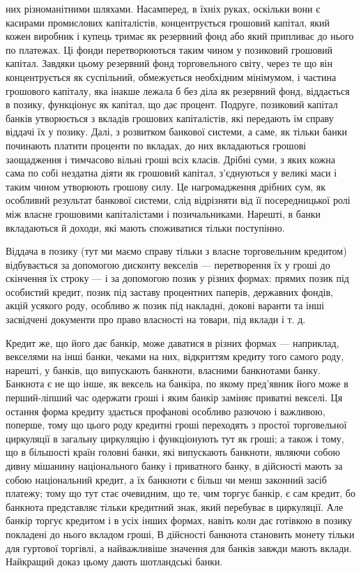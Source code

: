 \parcont{}  %
них різноманітними шляхами. Насамперед, в їхніх руках, оскільки
вони є касирами промислових капіталістів, концентрується грошовий
капітал, який кожен виробник і купець тримає як резервний
фонд або який припливає до нього по платежах. Ці
фонди перетворюються таким чином у позиковий грошовий
капітал. Завдяки цьому резервний фонд торговельного світу,
через те що він концентрується як суспільний, обмежується
необхідним мінімумом, і частина грошового капіталу, яка інакше
лежала б без діла як резервний фонд, віддається в позику,
функціонує як капітал, що дає процент. Подруге, позиковий
капітал банків утворюється з вкладів грошових капіталістів, які
передають їм справу віддачі їх у позику. Далі, з розвитком банкової
системи, а саме, як тільки банки починають платити проценти
по вкладах, до них вкладаються грошові заощадження
і тимчасово вільні гроші всіх класів. Дрібні суми, з яких кожна
сама по собі нездатна діяти як грошовий капітал, з’єднуються
у великі маси і таким чином утворюють грошову силу. Це нагромадження
дрібних сум, як особливий результат банкової системи,
слід відрізняти від її посередницької ролі між власне грошовими
капіталістами і позичальниками. Нарешті, в банки вкладаються
й доходи, які мають споживатися тільки поступінно.

Віддача в позику (тут ми маємо справу тільки з власне торговельним
кредитом) відбувається за допомогою дисконту векселів
— перетворення їх у гроші до скінчення їх строку — і за
допомогою позик у різних формах: прямих позик під особистий
кредит, позик під заставу процентних паперів, державних фондів,
акцій усякого роду, особливо ж позик під накладні, докові
варанти та інші засвідчені документи про право власності на
товари, під вклади і т. д.

Кредит же, що його дає банкір, може даватися в різних формах
— наприклад, векселями на інші банки, чеками на них, відкриттям
кредиту того самого роду, нарешті, у банків, що випускають
банкноти, власними банкнотами банку. Банкнота є не
що інше, як вексель на банкіра, по якому пред’явник його може
в перший-ліпший час одержати гроші і яким банкір заміняє приватні
векселі. Ця остання форма кредиту здається профанові
особливо разючою і важливою, поперше, тому що цього роду
кредитні гроші переходять з простої торговельної циркуляції
в загальну циркуляцію і функціонують тут як гроші; а також
і тому, що в більшості країн головні банки, які випускають
банкноти, являючи собою дивну мішанину національного банку
і приватного банку, в дійсності мають за собою національний
кредит, а їх банкноти є більш чи менш законний засіб платежу;
тому що тут стає очевидним, що те, чим торгує банкір, є сам
кредит, бо банкнота представляє тільки кредитний знак, який перебуває
в циркуляції. Але банкір торгує кредитом і в усіх інших формах,
навіть коли дає готівкою в позику покладені до нього вкладом
гроші, В дійсності банкнота становить монету тільки для гуртової
торгівлі, а найважливіше значення для банків завжди мають вклади. Найкращий доказ цьому дають
шотландські банки.

